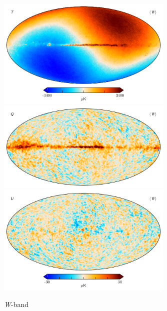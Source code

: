 \documentclass[twocolumn]{../../common/aa}
\newcommand{\W}[0]{\textit W}
\begin{document}
\begin{figure}
	\centering
	\includegraphics[width=0.75\textwidth]{figures/W_mu_I.pdf}
	\includegraphics[width=0.75\textwidth]{figures/W_mu_Q.pdf}
	\includegraphics[width=0.75\textwidth]{figures/W_mu_U.pdf}
	\caption{\W-band}
\end{figure}


\end{document}
